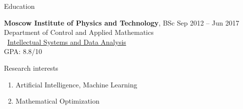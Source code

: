 \documentclass{resume} %
\begin{document}
\begin{rSection}{Education}

{\bf Moscow Institute of Physics and Technology}, BSc \hfill {Sep 2012 -- Jun 2017} \\ 
Department of Control and Applied Mathematics\\ \faExternalLink~\href{http://www.machinelearning.ru/}{Intellectual Systems and Data Analysis}\\
GPA: 8.8/10

\end{rSection}


\begin{rSection}{Research interests}
\begin{enumerate}
\item Artificial Intelligence, Machine Learning
\item Mathematical Optimization
\end{enumerate}
\end{rSection}
\end{document}
